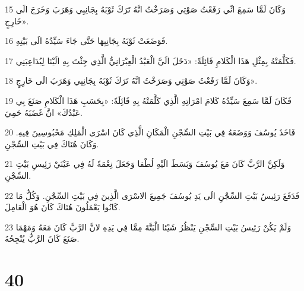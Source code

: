 \par 15 وَكَانَ لَمَّا سَمِعَ انِّي رَفَعْتُ صَوْتِي وَصَرَخْتُ انَّهُ تَرَكَ ثَوْبَهُ بِجَانِبِي وَهَرَبَ وَخَرَجَ الَى خَارِجٍ».
\par 16 فَوَضَعَتْ ثَوْبَهُ بِجَانِبِهَا حَتَّى جَاءَ سَيِّدُهُ الَى بَيْتِهِ.
\par 17 فَكَلَّمَتْهُ بِمِثْلِ هَذَا الْكَلامِ قَائِلَةً: «دَخَلَ الَيَّ الْعَبْدُ الْعِبْرَانِيُّ الَّذِي جِئْتَ بِهِ الَيْنَا لِيُدَاعِبَنِي.
\par 18 وَكَانَ لَمَّا رَفَعْتُ صَوْتِي وَصَرَخْتُ انَّهُ تَرَكَ ثَوْبَهُ بِجَانِبِي وَهَرَبَ الَى خَارِجٍ».
\par 19 فَكَانَ لَمَّا سَمِعَ سَيِّدُهُ كَلامَ امْرَاتِهِ الَّذِي كَلَّمَتْهُ بِهِ قَائِلَةً: «بِحَسَبِ هَذَا الْكَلامِ صَنَعَ بِي عَبْدُكَ» انَّ غَضَبَهُ حَمِيَ.
\par 20 فَاخَذَ يُوسُفَ وَوَضَعَهُ فِي بَيْتِ السِّجْنِ الْمَكَانِ الَّذِي كَانَ اسْرَى الْمَلِكِ مَحْبُوسِينَ فِيهِ. وَكَانَ هُنَاكَ فِي بَيْتِ السِّجْنِ.
\par 21 وَلَكِنَّ الرَّبَّ كَانَ مَعَ يُوسُفَ وَبَسَطَ الَيْهِ لُطْفا وَجَعَلَ نِعْمَةً لَهُ فِي عَيْنَيْ رَئِيسِ بَيْتِ السِّجْنِ.
\par 22 فَدَفَعَ رَئِيسُ بَيْتِ السِّجْنِ الَى يَدِ يُوسُفَ جَمِيعَ الاسْرَى الَّذِينَ فِي بَيْتِ السِّجْنِ. وَكُلُّ مَا كَانُوا يَعْمَلُونَ هُنَاكَ كَانَ هُوَ الْعَامِلَ.
\par 23 وَلَمْ يَكُنْ رَئِيسُ بَيْتِ السِّجْنِ يَنْظُرُ شَيْئا الْبَتَّةَ مِمَّا فِي يَدِهِ لانَّ الرَّبَّ كَانَ مَعَهُ وَمَهْمَا صَنَعَ كَانَ الرَّبُّ يُنْجِحُهُ.

\chapter{40}

